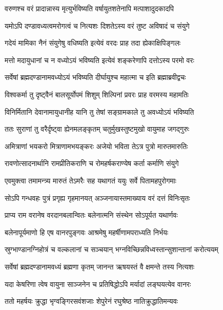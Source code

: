 \twolineshloka
{वरुणश्च वरं प्रादान्नास्य मृत्युर्भविष्यति}
{वर्षायुतशतेनापि मत्पाशादुदकादपि} %

\twolineshloka
{यमोऽपि दण्डावध्यत्वमरोगत्वं च नित्यशः}
{दिशतेऽस्य वरं तुष्ट अविषादं च संयुगे} %

\twolineshloka
{गदेयं मामिका नैनं संयुगेषु वधिष्यति}
{इत्येवं वरदः प्राह तदा ह्येकाक्षिपिङ्गलः} %

\twolineshloka
{मत्तो मदायुधानां च न वध्योऽयं भविष्यति}
{इत्येवं शङ्करेणापि दत्तोऽस्य परमो वरः} %

\twolineshloka
{सर्वेषां ब्रह्मदण्डानामवध्योऽयं भविष्यति}
{दीर्घायुश्च महात्मा च इति ब्रह्माब्रवीद्वचः} %

\twolineshloka
{विश्वकर्मा तु दृष्ट्वैनं बालसूर्योपमं शिशुम्}
{शिल्पिनां प्रवरः प्राह वरमस्य महामतिः} %

\twolineshloka
{विनिर्मितानि देवानामायुधानीह यानि तु}
{तेषां सङ्ग्रामकाले तु अवध्योऽयं भविष्यति} %

\twolineshloka
{ततः सुराणां तु वरैर्दृष्ट्वा ह्येनमलङ्कृतम्}
{चतुर्मुखस्तुष्टमुखो वायुमाह जगद्गुरुः} %

\twolineshloka
{अमित्राणां भयकरो मित्राणामभयङ्करः}
{अजेयो भविता तेऽत्र पुत्रो मारुतमारुतिः} %

\twolineshloka
{रावणोत्सादनार्थानि रामप्रीतिकराणि च}
{रोमहर्षकराण्येष कर्ता कर्माणि संयुगे} %

\twolineshloka
{एवमुक्त्वा तमामन्त्र्य मारुतं तेऽमरैः सह}
{यथागतं ययुः सर्वे पितामहपुरोगमाः} %

\twolineshloka
{सोऽपि गन्धवहः पुत्रं प्रगृह्य गृहमानयत्}
{अञ्जनायास्तमाख्याय वरं दत्तं विनिःसृतः} %

\twolineshloka
{प्राप्य राम वरानेष वरदानबलान्वितः}
{बलेनात्मनि संस्थेन सोऽपूर्यत यथार्णवः} %

\twolineshloka
{बलेनापूर्यमाणो हि एष वानरपुङ्गवः}
{आश्रमेषु महर्षीणामपराध्यति निर्भयः} %

\twolineshloka
{स्रुग्भाण्डानग्निहोत्रं च वल्कलानां च सञ्चयान्}
{भग्नविच्छिन्नविध्वस्तान्सुशान्तानां करोत्ययम्} %

\twolineshloka
{सर्वेषां ब्रह्मदण्डानामवध्यं ब्रह्मणा कृतम्}
{जानन्त ऋषयस्तं वै क्षमन्ते तस्य नित्यशः} %

\twolineshloka
{यदा केषरिणा त्वेष वायुना साञ्जनेन च}
{प्रतिषिद्धोऽपि मर्यादां लङ्घयत्येव वानरः} %

\twolineshloka
{ततो महर्षयः क्रुद्धा भृग्वङ्गिरसवंशजाः}
{शेपुरेनं रघुश्रेष्ठ नातिक्रुद्धातिमन्यवः} %

